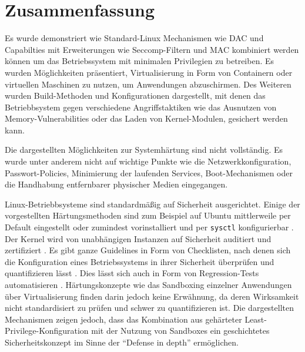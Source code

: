 
\chapter{Zusammenfassung}

Es wurde demonstriert wie Standard-Linux Mechanismen wie DAC und Capabilties mit Erweiterungen wie Seccomp-Filtern und MAC kombiniert werden können um das Betriebssystem mit minimalen Privilegien zu betreiben. Es wurden Möglichkeiten präsentiert, Virtualisierung in Form von Containern oder virtuellen Maschinen zu nutzen, um Anwendungen abzuschirmen. Des Weiteren wurden Build-Methoden und Konfigurationen dargestellt, mit denen das Betriebbsystem gegen verschiedene Angriffstaktiken
wie das Ausnutzen von Memory-Vulnerabilities oder das Laden von Kernel-Modulen, gesichert werden kann.

Die dargestellten Möglichkeiten zur Systemhärtung sind nicht vollständig. Es wurde unter anderem nicht auf wichtige Punkte wie die Netzwerkkonfiguration, Passwort-Policies, Minimierung der laufenden Services, Boot-Mechanismen oder die Handhabung entfernbarer physischer Medien eingegangen.

Linux-Betriebbsysteme sind standardmäßig auf Sicherheit ausgerichtet. Einige der vorgestellten Härtungsmethoden sind zum Beispiel auf Ubuntu mittlerweile per Default eingestellt oder zumindest vorinstalliert und per \texttt{sysctl} konfigurierbar \cite{ubuntu-security-features}. Der Kernel wird von unabhängigen Instanzen auf Sicherheit auditiert und zertifiziert \cite{ubuntu-certifications}. Es gibt ganze Guidelines in Form von Checklisten, nach denen sich die Konfiguration eines Betriebssystems in
ihrer Sicherheit überprüfen und quantifizieren lässt \cite{cis}. Dies lässt sich auch in Form von Regression-Tests automatisieren \cite{qa-regression}. Härtungskonzepte wie das Sandboxing einzelner Anwendungen über Virtualisierung finden darin jedoch keine Erwähnung, da deren Wirksamkeit nicht standardisiert zu prüfen und schwer zu quantifizieren ist. Die dargestellten Mechanismen zeigen jedoch, dass das Kombination aus gehärteter Least-Privilege-Konfiguration mit der Nutzung von
Sandboxes ein geschichtetes Sicherheitskonzept im Sinne der ``Defense in depth'' ermöglichen.
